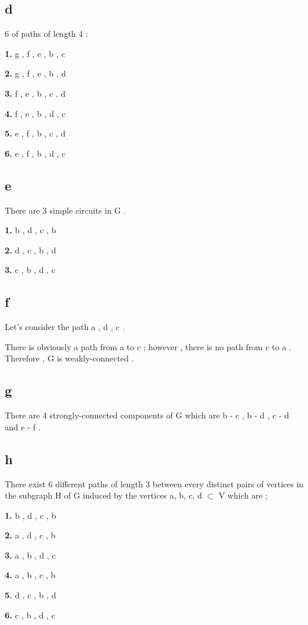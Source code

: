 \documentclass[11pt]{article}
\begin{document}
\subsection*{d}
\hspace{15px} 6 of paths of length 4 : \par 
\textbf{1.} g , f , e , b , c \par 
\textbf{2.} g , f , e , b , d \par 
\textbf{3.} f , e , b , c , d \par 
\textbf{4.} f , e , b , d , c \par 
\textbf{5.} e , f , b , c , d \par 
\textbf{6.} e , f , b , d , c \par 
\subsection*{e}
\hspace{15px} There are 3 simple circuits in G . \par
\textbf{1.} b , d , c , b \par
\textbf{2.} d , c , b , d \par 
\textbf{3.} c , b , d , c \par 
\subsection*{f}
\hspace{15px} Let's consider  the path a , d , c . \par There is obviously a path from a to c ; however , there is no path from c to a . Therefore , G is weakly-connected .

\subsection*{g}
\hspace{15px} There are 4 strongly-connected components of G which are b - c , b - d , c - d and e - f .
\subsection*{h}
\hspace{15px} There exist 6 different paths of length 3 between every distinct pairs of vertices in the subgraph H of G
induced by the vertices {a, b, c, d} $\subset$ V which are ; \par 
\textbf{1.} b , d , c , b \par 
\textbf{2.} a , d , c , b \par 
\textbf{3.} a , b , d , c \par 
\textbf{4.} a , b , c , b \par 
\textbf{5.} d , c , b , d \par 
\textbf{6.} c , b , d , c
\end{document}
